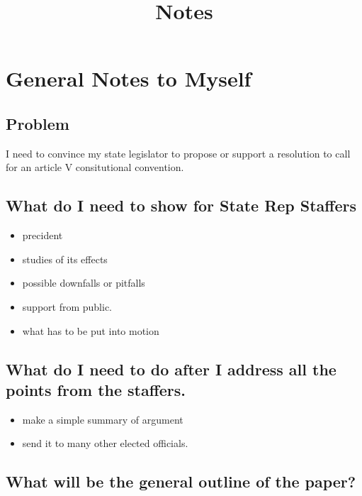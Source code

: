 \documentclass[11pt]{article} %
\title{Notes}
\begin{document}
\section{General Notes to Myself}

\subsection{Problem}
I need to convince my state legislator to propose or support a resolution to call for an article V consitutional convention.

\subsection{What do I need to show for State Rep Staffers}

\begin{itemize}

 \item precident

\item studies of its effects

\item possible downfalls or pitfalls

\item support from public.

\item what has to be put into motion 

\end{itemize}

\subsection{What do I need to do after I address all the points from the staffers.}

\begin{itemize}

\item make a simple summary of argument

 \item send it to many other elected officials.

\end{itemize}

\subsection{What will be the general outline of the paper?}
\end{document}
